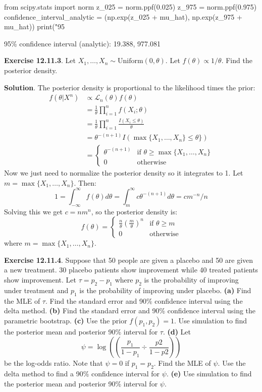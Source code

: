 \begin{python}
from scipy.stats import norm
z_025 = norm.ppf(0.025)
z_975 = norm.ppf(0.975)
confidence_interval_analytic = (np.exp(z_025 + mu_hat), np.exp(z_975 + mu_hat))
print("95%
\end{python}
\begin{console}
95\% confidence interval (analytic):  19.388, 977.081
\end{console}

\textbf{Exercise 12.11.3}. Let
\(X_{1}, \dots, X_{n} \sim \text{Uniform}(0, \theta)\). Let
\(f(\theta) \propto 1/\theta\). Find the posterior density.

\textbf{Solution}. The posterior density is proportional to the
likelihood times the prior:
\begin{align*}
f(\theta | X^{n}) &\propto \mathcal{L}_{n}(\theta) f(\theta) \\
&= \frac{1}{\theta} \prod_{i=1}^{n} f(X_{i}; \theta)  \\
&= \frac{1}{\theta} \prod_{i=1}^{n} \frac{I(X_{i} \leq \theta)}{\theta} \\
&= \theta^{-(n+1)} I( \max \{ X_{1}, \dots, X_{n} \} \leq \theta \} ) \\
&= \begin{cases}
\theta^{-(n+1)} & \text{if } \theta \geq \max \{ X_{1}, \dots, X_{n} \} \\
0 & \text{otherwise}
\end{cases}
\end{align*}
Now we just need to normalize the posterior density so it integrates to
1. Let \(m = \max \{ X_{1}, \dots, X_{n} \}\). Then:
\[
1 = \int_{-\infty}^{\infty} f(\theta) d\theta  = \int_m^{\infty} c \theta^{-(n+1)} d\theta = c m^{-n} / n
\]
Solving this we get \(c = n m^{n}\), so the posterior density is:
\[
f(\theta) = \begin{cases}
\frac{n}{\theta} \left(\frac{m}{\theta}\right)^{n} & \text{if } \theta \geq m \\
0 & \text{otherwise}
\end{cases}
\]
where \(m = \max \{ X_{1}, \dots, X_{n} \}\).

\textbf{Exercise 12.11.4}. Suppose that 50 people are given a placebo
and 50 are given a new treatment. 30 placebo patients show improvement
while 40 treated patients show improvement. Let \(\tau = p_{2} - p_{1}\)
where \(p_{2}\) is the probability of improving under treatment and
\(p_{1}\) is the probability of improving under placebo.
\textbf{(a)} Find the MLE of \(\tau\). Find the standard error and 90\%
confidence interval using the delta method.
\textbf{(b)} Find the standard error and 90\% confidence interval using
the parametric bootstrap.
\textbf{(c)} Use the prior \(f(p_{1}, p_{2}) = 1\). Use simulation to find
the posterior mean and posterior 90\% interval for \(\tau\).
\textbf{(d)} Let
\[
\psi = \log \left( \left( \frac{p_{1}}{1 - p_{1}} \div \frac{p2}{1 - p2} \right) \right)
\]
be the log-odds ratio. Note that \(\psi = 0\) if \(p_{1} = p_{2}\). Find the
MLE of \(\psi\). Use the delta method to find a 90\% confidence interval
for \(\psi\).
\textbf{(e)} Use simulation to find the posterior mean and posterior
90\% interval for \(\psi\).

